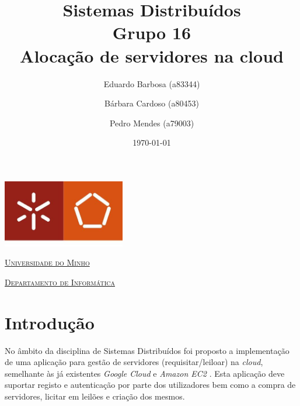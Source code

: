 \documentclass[a4paper]{article}
\begin{document}
\title{Sistemas Distribuídos\\ Grupo 16 \\ Alocação de servidores na cloud}
\author{Eduardo Barbosa (a83344) \and Bárbara Cardoso (a80453) \and Pedro Mendes (a79003)}
\date{\today}

\begin{titlepage}

    \thispagestyle{empty}
    \begin{center}
        \begin{minipage}{0.75\linewidth}
            \centering
            \includegraphics[width=0.4\textwidth]{eng.jpeg}\par\vspace{1cm}
            \vspace{1.5cm}
            \href{https://www.uminho.pt/PT}{\scshape\LARGE Universidade do Minho} \par
            \vspace{1cm}
            \href{https://www.di.uminho.pt/}{\scshape\Large Departamento de Informática} \par
            \vspace{1.5cm}

            \maketitle
        \end{minipage}
    \end{center}

\end{titlepage}

\tableofcontents

\pagebreak

\section{Introdução}
No âmbito da disciplina de Sistemas Distribuídos foi proposto a implementação de uma aplicação para gestão de servidores (requisitar/leiloar) na \textit{cloud}, semelhante às já existentes \textit{Google Cloud} e \textit{Amazon EC2} . Esta aplicação deve suportar registo e autenticação por parte dos utilizadores bem como a compra de servidores, licitar em leilões e criação dos mesmos.
\end{document}
